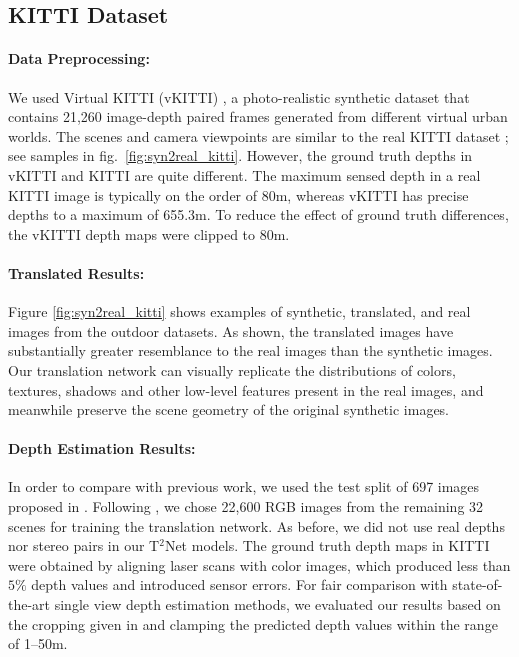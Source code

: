 \documentclass[runningheads]{llncs}
\begin{document}
\subsection{KITTI Dataset}

\paragraph{\bf Data Preprocessing:} We used Virtual KITTI (vKITTI) \cite{gaidon2016virtualworlds}, a photo-realistic synthetic dataset that contains 21,260 image-depth paired frames generated from different virtual urban worlds. The scenes and camera viewpoints are similar to the real KITTI dataset \cite{Menze2015CVPR}; see samples in fig.~\ref{fig:syn2real_kitti}. However, the ground truth depths in vKITTI and KITTI are quite different. The maximum sensed depth in a real KITTI image is typically on the order of 80m, whereas vKITTI has precise depths to a maximum of 655.3m. To reduce the effect of ground truth differences, the vKITTI depth maps were clipped to 80m.

\paragraph{\bf Translated Results:} Figure \ref{fig:syn2real_kitti} shows examples of synthetic, translated, and real images from the outdoor datasets. As shown, the translated images have substantially greater resemblance to the real images than the synthetic images. Our translation network can visually replicate the distributions of colors, textures, shadows and other low-level features present in the real images, and meanwhile preserve the scene geometry of the original synthetic images.


\paragraph{\bf Depth Estimation Results:} In order to compare with previous work, we used the test split of 697 images proposed in \cite{eigen2014depth}. Following \cite{godard2017unsupervised}, we chose 22,600 RGB images from the remaining 32 scenes for training the translation network. As before, we did not use real depths nor stereo pairs in our T$^2$Net models. The ground truth depth maps in KITTI were obtained by aligning laser scans with color images, which produced less than $5\%$ depth values and introduced sensor errors. For fair comparison with state-of-the-art single view depth estimation methods, we evaluated our results based on the cropping given in \cite{garg2016unsupervised} and clamping the predicted depth values within the range of 1--50m.
\end{document}
